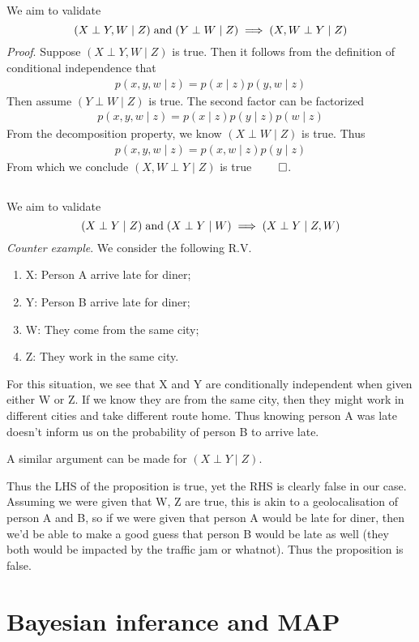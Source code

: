 \documentclass{article}
\newcommand{\s}{\hspace{0.1cm}}
\numberwithin{equation}{section}
\begin{document}
\subsection{}
We aim to validate
\begin{equation}
        (X \perp Y,W \mid Z) \s \text{and} \s (Y \perp W \mid Z) \implies  (X,W \perp Y \mid Z)
\end{equation}
\textit{Proof}. Suppose $(X \perp Y,W \mid Z)$ is true. 
Then it follows from the definition of conditional independence that
\begin{align*}
        p(x,y,w \mid z) = p(x \mid z) p(y,w \mid z) 
\end{align*}
Then assume $(Y \perp W \mid Z)$ is true. The second factor can be factorized
\begin{align*}
        p(x,y,w \mid z) = p(x \mid z) p(y \mid z) p(w \mid z)
\end{align*}
From the decomposition property, we know $(X \perp W \mid Z)$ is true. Thus
\begin{align*}
        p(x,y,w \mid z)  = p(x,w \mid z) p(y \mid z)
\end{align*}
From which we conclude $(X,W \perp Y \mid Z)$ is true $\qed$.

\subsection{}
We aim to validate
\begin{equation}
        (X \perp Y \mid Z) \s \text{and} \s (X \perp Y \mid W) \implies (X \perp Y \mid Z,W)
\end{equation}
\textit{Counter example}. We consider the following R.V.
\begin{enumerate}
        \item X: Person A arrive late for diner;
        \item Y: Person B arrive late for diner;
        \item W: They come from the same city;
        \item Z: They work in the same city.
\end{enumerate}
For this situation, we see that X and Y are conditionally independent when 
given either W or Z. If we know they are from the same city, then they might work 
in different cities and take different route home. Thus knowing person A was late doesn't inform 
us on the probability of person B to arrive late. \par
A similar argument can be made for  $(X \perp Y \mid Z)$. \par
Thus the LHS of the proposition is true, yet the RHS is clearly false in our case. 
Assuming we were given that W, Z are true, this is akin to a geolocalisation of person A and B,
so if we were given that 
person A would be late for diner, then we'd be able to make a good guess that person B would 
be late as well (they both would be impacted by the traffic jam or whatnot).
Thus the proposition is false.

\section{Bayesian inferance and MAP}
\end{document}
